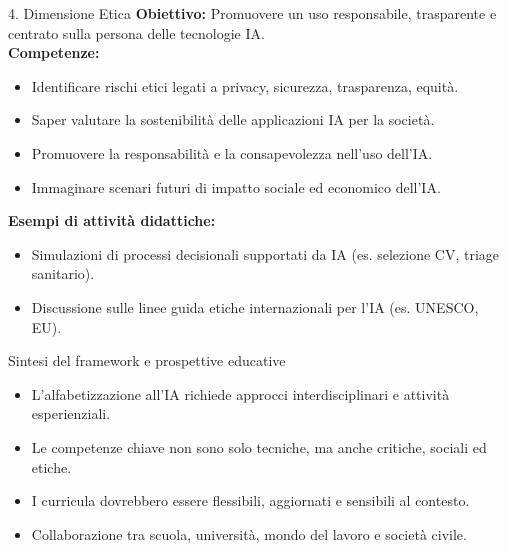 \documentclass{beamer}
\begin{document}
%
%
\begin{frame}{4. Dimensione Etica}
  \textbf{Obiettivo:} Promuovere un uso responsabile, trasparente e centrato sulla persona delle tecnologie IA.\\[1em]
  \textbf{Competenze:}
  \begin{itemize}
    \item Identificare rischi etici legati a privacy, sicurezza, trasparenza, equità.
    \item Saper valutare la sostenibilità delle applicazioni IA per la società.
    \item Promuovere la responsabilità e la consapevolezza nell’uso dell’IA.
    \item Immaginare scenari futuri di impatto sociale ed economico dell’IA.
  \end{itemize}
  \textbf{Esempi di attività didattiche:}
  \begin{itemize}
    \item Simulazioni di processi decisionali supportati da IA (es. selezione CV, triage sanitario).
    \item Discussione sulle linee guida etiche internazionali per l’IA (es. UNESCO, EU).
  \end{itemize}
\end{frame}
%
%
\begin{frame}{Sintesi del framework e prospettive educative}
  \begin{itemize}
    \item L’alfabetizzazione all’IA richiede approcci interdisciplinari e attività esperienziali.
    \item Le competenze chiave non sono solo tecniche, ma anche critiche, sociali ed etiche.
    \item I curricula dovrebbero essere flessibili, aggiornati e sensibili al contesto.
    \item Collaborazione tra scuola, università, mondo del lavoro e società civile.
  \end{itemize}
\end{frame}
%
\end{document}
